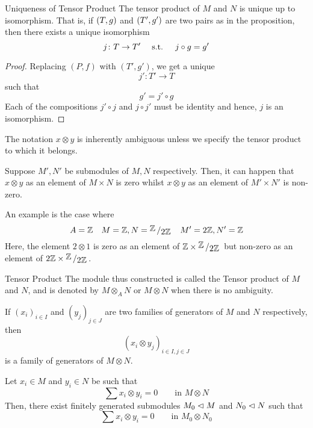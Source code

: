 \begin{proposition}{Uniqueness of Tensor Product}{}
	The tensor product of \(M\) and \(N\) is unique up to isomorphism.
	That is, if \(\left( T, g \right)\) and \(\left( T', g' \right)\) are two pairs
	as in the proposition, then there exists a unique isomorphism
	\[
		j \colon T \to T' \quad \text{ s.t. } \quad j \circ g = g'
	\]
\end{proposition}

\begin{proof}
	Replacing \((P, f)\) with \((T', g')\), we get a unique
	\[
		j' \colon T' \to T
	\]
	such that
	\[
		g' = j' \circ g
	\]
	Each of the compositions \(j' \circ j\) and \(j \circ j'\) must
	be identity and hence, \(j\) is an isomorphism.
\end{proof}


\begin{note}
	The notation \(x \otimes y\) is inherently ambiguous unless we
	specify the tensor product to which it belongs.

	Suppose \(M', N'\) be submodules of \(M, N\) respectively.
	Then, it can happen that \(x \otimes y\) as an element of
	\(M \times N\) is zero whilst \(x \otimes y\) as an element of
	\(M' \times N'\) is non-zero.

	An example is the case where
	\[
		A = \ZZ \quad M = \ZZ, N = \bigslant{\ZZ}{2\ZZ}
		\quad M' = 2\ZZ, N' = \ZZ
	\]
	Here, the element \(2 \otimes 1\) is zero as an element of
	\(\ZZ \times \bigslant{\ZZ}{2\ZZ}\)
	but non-zero as an element of \(2\ZZ \times \bigslant{\ZZ}{2\ZZ}\).
\end{note}

\begin{defn}{Tensor Product}{}
	The module thus constructed is called the Tensor product of \(M\)
	and \(N\), and is denoted by \(M \otimes_A N\) or
	\(M \otimes N\) when there is no ambiguity.
\end{defn}

If \((x_i)_{i \in I}\) and \((y_j)_{j \in J}\) are two families
of generators of \(M\) and \(N\) respectively, then
\[
	(x_i \otimes y_j)_{i \in I, j \in J}
\]
is a family of generators of \(M \otimes N\).


\begin{corollary}{}{}
	Let \(x_i \in M\) and \(y_i \in N\) be such that
	\[
		\sum x_i \otimes y_i = 0 \quad\quad \text{in } M \otimes N
	\]
	Then, there exist finitely generated submodules \(M_0 \vartriangleleft M\)
	and \(N_0 \vartriangleleft N\) such that
	\[
		\sum x_i \otimes y_i = 0 \quad\quad \text{in } M_0 \otimes N_0
	\]
\end{corollary}

